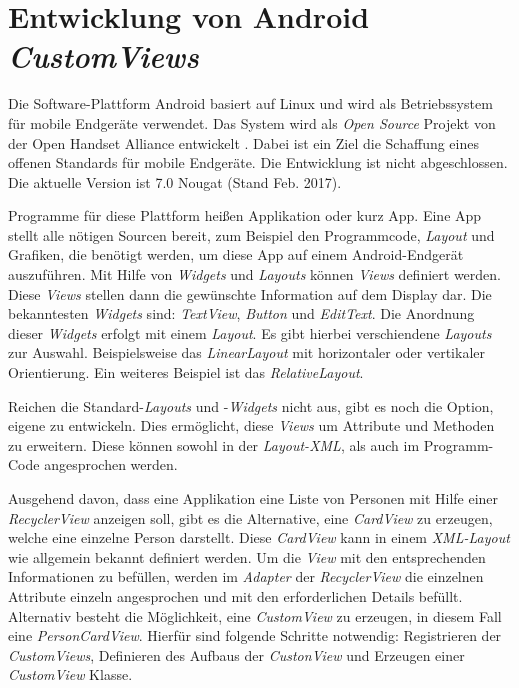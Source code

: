 \section{Entwicklung von Android \textit{CustomViews}}\label{sec:custom_view}
Die Software-Plattform Android basiert auf Linux und wird als Betriebssystem für mobile Endgeräte verwendet.
Das System wird als \textit{Open Source} Projekt von der Open Handset Alliance entwickelt \cite{open_handset_alliance}. Dabei ist ein Ziel die Schaffung eines offenen Standards für mobile Endgeräte.
Die Entwicklung ist nicht abgeschlossen. Die aktuelle Version ist 7.0 Nougat (Stand Feb. 2017).

Programme für diese Plattform heißen Applikation oder kurz App. Eine App stellt alle nötigen Sourcen bereit, zum Beispiel den Programmcode, \textit{Layout} und Grafiken, die benötigt werden, um diese App auf einem Android-Endgerät auszuführen.
Mit Hilfe von \textit{Widgets} und \textit{Layouts} können \textit{Views} definiert werden. Diese \textit{Views} stellen dann die gewünschte Information auf dem Display dar. Die bekanntesten \textit{Widgets} sind: \textit{TextView}, \textit{Button} und \textit{EditText}. Die Anordnung dieser \textit{Widgets} erfolgt mit einem \textit{Layout}. Es gibt hierbei verschiendene \textit{Layouts} zur Auswahl. Beispielsweise das \textit{LinearLayout} mit horizontaler oder vertikaler Orientierung. Ein weiteres Beispiel ist das \textit{RelativeLayout}.

Reichen die Standard-\textit{Layouts} und -\textit{Widgets} nicht aus, gibt es noch die Option, eigene zu entwickeln. Dies ermöglicht, diese \textit{Views} um Attribute und Methoden zu erweitern. Diese können sowohl in der \textit{Layout-XML}, als auch im Programm-Code angesprochen werden.

Ausgehend davon, dass eine Applikation eine Liste von Personen mit Hilfe einer \textit{RecyclerView} anzeigen soll, gibt es die Alternative, eine \textit{CardView} zu erzeugen, welche eine einzelne Person darstellt. Diese \textit{CardView} kann in einem \textit{XML-Layout} wie allgemein bekannt definiert werden. Um die \textit{View} mit den entsprechenden Informationen zu befüllen, werden im \textit{Adapter} der \textit{RecyclerView} die einzelnen Attribute einzeln angesprochen und mit den erforderlichen Details befüllt.
Alternativ besteht die Möglichkeit, eine \textit{CustomView} zu erzeugen, in diesem Fall eine \textit{PersonCardView}.
Hierfür sind folgende Schritte notwendig: Registrieren der \textit{CustomViews}, Definieren des Aufbaus der \textit{CustonView} und Erzeugen einer \textit{CustomView} Klasse.

